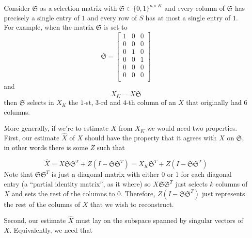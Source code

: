 \documentclass[conference]{IEEEtran}
\begin{document}
Consider $\mathfrak{S}$ as a selection matrix with $\mathfrak{S} \in \{0,1\}^{n \times K}$ and every column of $\mathfrak{S}$ has precisely a single entry of $1$ and every row of $S$ has at most a single entry of $1$.
For example, when the matrix $\mathfrak{S}$ is set to
$$
\mathfrak{S} = 
\begin{bmatrix}
1 & 0 & 0 \\
0 & 0 & 0 \\
0 & 1 & 0 \\
0 & 0 & 1 \\
0 & 0 & 0 \\
0 & 0 & 0 \\
\end{bmatrix}
$$
\noindent
and
$$X_K = X \mathfrak{S}$$
\noindent
then $\mathfrak{S}$  selects in $X_K$ the $1$-st, $3$-rd and $4$-th column of an $X$ that originally had $6$ columns.  


More generally, if we're to estimate $X$ from $X_K$ we would need two properties.
First, our estimate $\hat{X}$ of $X$ should have the property that it agrees with $X$ on $\mathfrak{S}$, in other words there is some $Z$ such that

$$
\hat{X} = X \mathfrak{S} \mathfrak{S}^T + Z (I-\mathfrak{S} \mathfrak{S}^T) = X_K \mathfrak{S}^T + Z (I-\mathfrak{S} \mathfrak{S}^T)
$$
\noindent  Note that $\mathfrak{S} \mathfrak{S}^T$ is just a diagonal matrix with either $0$ or $1$ for each diagonal entry (a ``partial identity matrix'', as it where) so $X \mathfrak{S} \mathfrak{S}^T$ just selects $k$ columns of $X$ and sets the rest of the columns to $0$.  Therefore, $Z (I-\mathfrak{S} \mathfrak{S}^T)$ just represents the rest of the columns of $X$ that we wish to reconstruct.

Second, our estimate $\hat{X}$ must lay on the subspace spanned by singular vectors of $X$.  Equivalently, we need that
\end{document}
